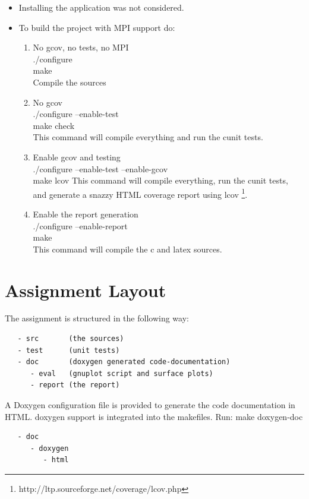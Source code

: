 \documentclass[12pt,a4paper]{report}
\begin{document}
\begin{itemize}
\item Installing the application was not considered.
\item To build the project with MPI support do:
  \begin{enumerate}
  \item No gcov, no tests, no MPI\\
    ./configure \\
    make\\
    Compile the sources
  \item No gcov\\
    ./configure --enable-test\\
    make check\\
    This command will compile everything and run the cunit tests.
  \item Enable gcov and testing\\
    ./configure --enable-test --enable-gcov\\
    make lcov This command will compile everything, run the cunit
    tests, and generate a snazzy HTML coverage report using lcov
    \footnote{http://ltp.sourceforge.net/coverage/lcov.php}.
  \item Enable the report generation\\
    ./configure --enable-report\\
    make\\
    This command will compile the c and latex sources.
  \end{enumerate}
\end{itemize}

\section{Assignment Layout}
\label{sec:assignment-layout}

The assignment is structured in the following way:
\begin{verbatim}
   - src       (the sources)
   - test      (unit tests)
   - doc       (doxygen generated code-documentation)
      - eval   (gnuplot script and surface plots)
      - report (the report)
\end{verbatim}

A Doxygen configuration file is provided to generate the code
documentation in HTML. doxygen support is integrated into the
makefiles.  Run: make doxygen-doc

\begin{verbatim}
   - doc
      - doxygen
         - html
\end{verbatim}
\end{document}
